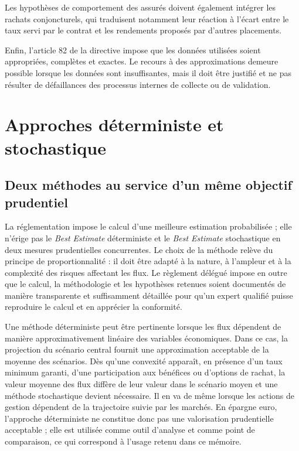 Les hypothèses de comportement des assurés doivent également intégrer les 
rachats conjoncturels, qui traduisent notamment leur réaction à l'écart entre 
le taux servi par le contrat et les rendements proposés par d'autres placements.

Enfin, l'article 82 de la directive impose que les données utilisées soient
appropriées, complètes et exactes. Le recours à des approximations demeure
possible lorsque les données sont insuffisantes, mais il doit être justifié et
ne pas résulter de défaillances des processus internes de collecte ou de
validation.

\section{Approches déterministe et stochastique}

\subsection{Deux méthodes au service d'un même objectif prudentiel}

La réglementation impose le calcul d'une meilleure estimation probabilisée ;
elle n'érige pas le \textit{Best Estimate} déterministe et le \textit{Best
Estimate} stochastique en deux mesures prudentielles concurrentes. Le choix de
la méthode relève du principe de proportionnalité : il doit être adapté à la
nature, à l'ampleur et à la complexité des risques affectant les flux. Le
règlement délégué impose en outre que le calcul, la méthodologie et les
hypothèses retenues soient documentés de manière transparente et suffisamment
détaillée pour qu'un expert qualifié puisse reproduire le calcul et en
apprécier la conformité.

Une méthode déterministe peut être pertinente lorsque les flux dépendent de
manière approximativement linéaire des variables économiques. Dans ce cas, la
projection du scénario central fournit une approximation acceptable de la
moyenne des scénarios. Dès qu'une convexité apparaît, en présence d'un taux
minimum garanti, d'une participation aux bénéfices ou d'options de rachat, la
valeur moyenne des flux diffère de leur valeur dans le scénario moyen et une
méthode stochastique devient nécessaire. Il en va de même lorsque les actions
de gestion dépendent de la trajectoire suivie par les marchés. En épargne
euro, l'approche déterministe ne constitue donc pas une valorisation
prudentielle acceptable ; elle est utilisée comme outil d'analyse et comme
point de comparaison, ce qui correspond à l'usage retenu dans ce mémoire.

